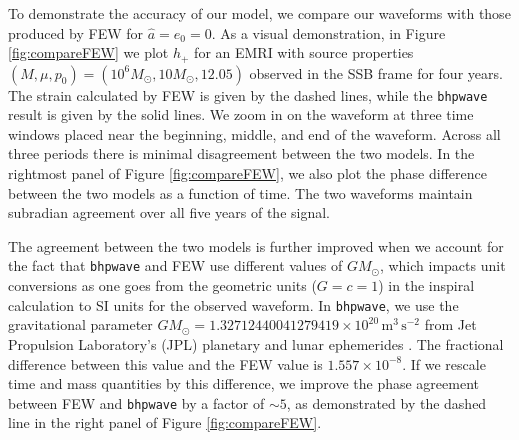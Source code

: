 \documentclass[%
 reprint,
 nofootinbib,
 amsmath,amssymb,
 aps,
 prd,
]{revtex4-2}
\begin{document}
To demonstrate the accuracy of our model, we compare our waveforms with those produced by FEW for $\hat{a} = e_0 = 0$. As a visual demonstration, in Figure \ref{fig:compareFEW} we plot $h_+$ for an EMRI with source properties $(M, \mu, p_0) = (10^6 M_\odot, 10 M_\odot, 12.05)$ observed in the SSB frame for four years. The strain calculated by FEW is given by the dashed lines, while the \texttt{bhpwave} result is given by the solid lines. We zoom in on the waveform at three time windows placed near the beginning, middle, and end of the waveform. Across all three periods there is minimal disagreement between the two models. In the rightmost panel of Figure \ref{fig:compareFEW}, we also plot the phase difference between the two models as a function of time. The two waveforms maintain subradian agreement over all five years of the signal. 

The agreement between the two models is further improved when we account for the fact that \texttt{bhpwave} and FEW use different values of $G M_\odot$, which impacts unit conversions as one goes from the geometric units ($G=c=1$) in the inspiral calculation to SI units for the observed waveform. In \texttt{bhpwave}, we use the gravitational parameter $G M_\odot = 1.32712440041279419 \times 10^{20}\, \mathrm{m}^3\, \mathrm{s}^{-2}$ from Jet Propulsion Laboratory's (JPL) planetary and lunar ephemerides \cite{ParkETC21}. The fractional difference between this value and the FEW value is $1.557\times 10^{-8}$. If we rescale time and mass quantities by this difference, we improve the phase agreement between FEW and \texttt{bhpwave} by a factor of $\sim 5$, as demonstrated by the dashed line in the right panel of Figure \ref{fig:compareFEW}.
\end{document}
